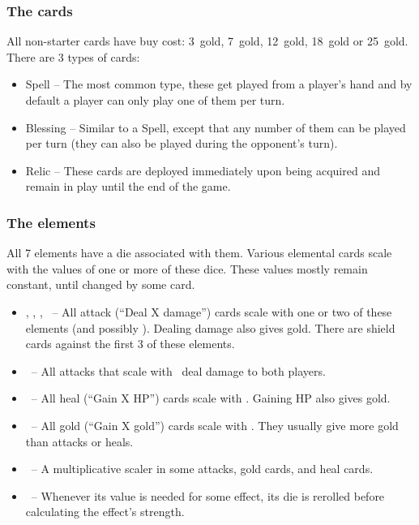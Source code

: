 \documentclass[dvipsnames,parskip,a4paper]{scrartcl}
\newcommand{\iconsize}{3.4mm}
\newcommand{\icondepth}{0.45mm}
\newcommand{\icon}[1]{\raisebox{-\icondepth}{\texttt{[image:  \#1 ]}}}
\newcommand{\fire}{\icon{icons/fire.png}}
\newcommand{\earth}{\icon{icons/earth.png}}
\newcommand{\water}{\icon{icons/water.png}}
\newcommand{\nature}{\icon{icons/nature.png}}
\newcommand{\magic}{\icon{icons/magic.png}}
\newcommand{\gold}{\icon{icons/gold.png}}
\newcommand{\chance}{\icon{icons/chance.png}}
\newcommand{\onecost}{3}
\newcommand{\twocost}{7}
\newcommand{\threecost}{12}
\newcommand{\fourcost}{18}
\newcommand{\fivecost}{25}
\begin{document}
\subsubsection*{The cards}

All non-starter cards have buy cost: \onecost \ gold, \twocost \ gold, \threecost \ gold, \fourcost \ gold or \fivecost \ gold.
There are 3 types of cards:

\begin{itemize}
\item Spell -- The most common type, these get played from a player's hand and by default a player can only play one of them per turn.
\item Blessing -- Similar to a Spell, except that any number of them can be played per turn (they can also be played during the opponent's turn).
\item Relic -- These cards are deployed immediately upon being acquired and remain in play until the end of the game.
\end{itemize}

\subsubsection*{The elements}

All 7 elements have a die associated with them. Various elemental cards scale with the values of one or more of these dice. These values mostly remain constant, until changed by some card.

\begin{itemize}
\item \fire, \earth, \water, \chance \ -- All attack (``Deal X damage'') cards scale with one or two of these elements (and possibly \magic). Dealing damage also gives gold. There are shield cards against the first 3 of these elements.
\item \water \ -- All attacks that scale with \water \ deal damage to both players.
\item \nature \ -- All heal (``Gain X HP'') cards scale with \nature. Gaining HP also gives gold.
\item \gold \ -- All gold (``Gain X gold'') cards scale with \gold. They usually give more gold than attacks or heals.
\item \magic \ -- A multiplicative scaler in some attacks, gold cards, and heal cards.
\item \chance \ -- Whenever its value is needed for some effect, its die is rerolled before calculating the effect's strength.
\end{itemize}
\end{document}
